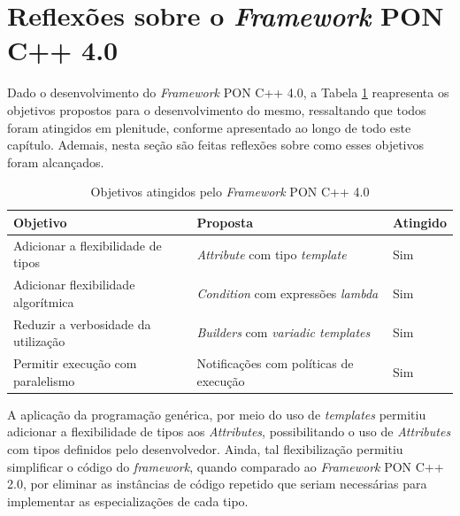 
\section{Reflexões sobre o \textit{Framework} PON C++ 4.0}\label{sec:dev_reflex}

Dado o desenvolvimento do \textit{Framework} PON C++ 4.0, a Tabela
\ref{tab:obj_fw4_atingidos} reapresenta os objetivos propostos para o
desenvolvimento do mesmo, ressaltando que todos foram atingidos em plenitude,
conforme apresentado ao longo de todo este capítulo. Ademais, nesta seção são
feitas reflexões sobre como esses objetivos foram alcançados.

\begin{table}[!htb]
\centering
\caption{Objetivos atingidos pelo \textit{Framework} PON C++ 4.0}
\smallskip
\begin{tabularx}{\textwidth}{|l|X|l|}\hline
    Objetivo & Proposta & Atingido  \\\hline\hline
    Adicionar a flexibilidade de tipos & \textit{Attribute} com tipo \textit{template} & Sim \\ \hline
    Adicionar flexibilidade algorítmica & \textit{Condition} com expressões \textit{lambda} & Sim \\ \hline
    Reduzir a verbosidade da utilização & \textit{Builders} com \textit{variadic templates} & Sim \\ \hline
    Permitir execução com paralelismo & Notificações com políticas de execução & Sim \\ \hline
    \end{tabularx}
    \label{tab:obj_fw4_atingidos}
\end{table}

A aplicação da programação genérica, por meio do uso de \textit{templates}
permitiu adicionar a flexibilidade de tipos aos \textit{Attributes},
possibilitando o uso de \textit{Attributes} com tipos definidos pelo
desenvolvedor. Ainda, tal flexibilização permitiu simplificar o código do
\textit{framework}, quando comparado ao \textit{Framework} PON C++ 2.0, por
eliminar as instâncias de código repetido que seriam necessárias para
implementar as especializações de cada tipo. 

